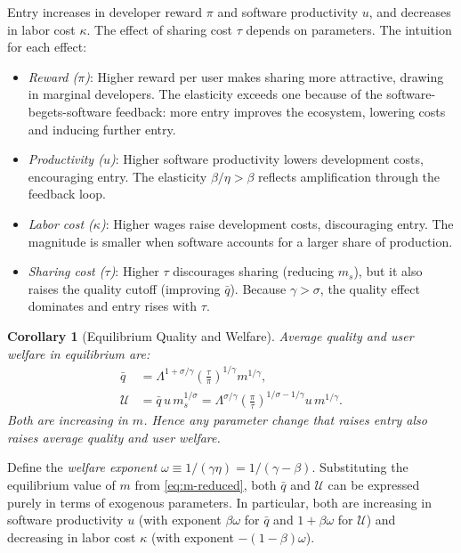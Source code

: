 \documentclass[11pt,a4paper]{article}
\newtheorem{corollary}{Corollary}
\theoremstyle{definition}
\theoremstyle{remark}
\begin{document}
Entry increases in developer reward \(\pi\) and software productivity
\(u\), and decreases in labor cost \(\kappa\). The effect of sharing
cost \(\tau\) depends on parameters. The intuition for each effect:

\begin{itemize}
\item \emph{Reward ($\pi$)}: Higher reward per user makes sharing more attractive, drawing in marginal developers. The elasticity exceeds one because of the software-begets-software feedback: more entry improves the ecosystem, lowering costs and inducing further entry.
\item \emph{Productivity ($u$)}: Higher software productivity lowers development costs, encouraging entry. The elasticity $\beta/\eta > \beta$ reflects amplification through the feedback loop.
\item \emph{Labor cost ($\kappa$)}: Higher wages raise development costs, discouraging entry. The magnitude is smaller when software accounts for a larger share of production.
\item \emph{Sharing cost ($\tau$)}: Higher $\tau$ discourages sharing (reducing $m_s$), but it also raises the quality cutoff (improving $\bar{q}$). Because $\gamma > \sigma$, the quality effect dominates and entry rises with $\tau$.
\end{itemize}

\begin{corollary}[Equilibrium Quality and Welfare]\label{cor:quality-welfare}
Average quality and user welfare in equilibrium are:
\begin{align}
\bar{q} &= \Lambda^{1+\sigma/\gamma} \left(\frac{\tau}{\pi}\right)^{1/\gamma} m^{1/\gamma}, \label{eq:qbar-m}\\
\mathcal{U} &= \bar{q} \, u \, m_s^{1/\sigma} = \Lambda^{\sigma/\gamma} \left(\frac{\pi}{\tau}\right)^{1/\sigma - 1/\gamma} u \, m^{1/\gamma}. \label{eq:U-m}
\end{align}
Both are increasing in $m$. Hence any parameter change that raises entry also raises average quality and user welfare.
\end{corollary}

Define the \emph{welfare exponent} $\omega \equiv 1/(\gamma\eta) = 1/(\gamma - \beta)$. Substituting the equilibrium value of $m$ from \eqref{eq:m-reduced}, both $\bar{q}$ and $\mathcal{U}$ can be expressed purely in terms of exogenous parameters. In particular, both are increasing in software productivity $u$ (with exponent $\beta\omega$ for $\bar{q}$ and $1 + \beta\omega$ for $\mathcal{U}$) and decreasing in labor cost $\kappa$ (with exponent $-(1-\beta)\omega$).
\end{document}
